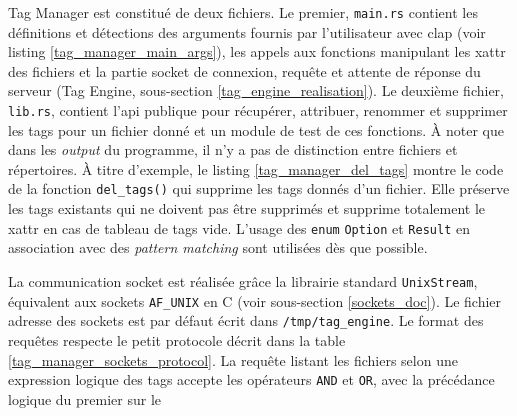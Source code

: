 \bigbreak
Tag Manager est constitué de deux fichiers. Le premier, \texttt{main.rs} contient les 
définitions et détections des arguments fournis par l'utilisateur avec clap (voir listing 
\ref{tag_manager_main_args}), les appels aux fonctions 
manipulant les \acrshort{xattr} des fichiers et la partie socket de connexion, requête et attente 
de réponse du serveur (Tag Engine, sous-section \ref{tag_engine_realisation}). Le deuxième fichier, 
\texttt{lib.rs}, contient l'\acrshort{api} publique pour récupérer, attribuer, renommer 
et supprimer les tags pour un fichier donné et un module de test de ces fonctions. À noter que 
dans les \textit{output} du programme, il n'y a pas de distinction entre fichiers et répertoires.
À titre d'exemple, 
le listing \ref{tag_manager_del_tags} montre le code de la fonction \texttt{del_tags()} 
qui supprime les tags donnés d'un fichier. Elle préserve les tags existants qui ne doivent pas être 
supprimés et supprime totalement le \acrshort{xattr} en cas de tableau de tags vide. L'usage 
des \texttt{enum} \texttt{Option} et \texttt{Result} en association 
avec des \textit{pattern matching} sont utilisées dès que possible.
\bigbreak
{}
\bigbreak
\bigbreak
{}
\bigbreak
La communication socket est réalisée grâce la librairie standard \texttt{UnixStream}, 
équivalent aux sockets \texttt{AF_UNIX} en C (voir sous-section \ref{sockets_doc}). Le 
fichier adresse des sockets est par défaut écrit dans \texttt{/tmp/tag_engine}. Le format 
des requêtes respecte le petit protocole décrit dans la table \ref{tag_manager_sockets_protocol}.
La requête listant les fichiers selon une expression logique des tags accepte les opérateurs 
\texttt{AND} et \texttt{OR}, avec la précédance logique du premier sur le 
